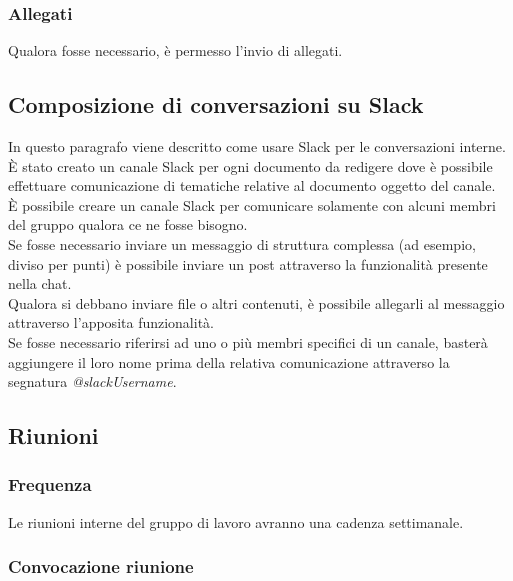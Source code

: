 \documentclass[../NormeDiProgetto.tex]{subfiles}
\begin{document}
				\subsubsection{Allegati}
					Qualora fosse necessario, è permesso l'invio di allegati.
			\subsection{Composizione di conversazioni su Slack}
				In questo paragrafo viene descritto come usare Slack per le conversazioni interne.\\
				È stato creato un canale Slack per ogni documento da redigere dove è possibile
				effettuare comunicazione di tematiche relative al documento oggetto del canale.\\
				È possibile creare un canale Slack per comunicare solamente con alcuni membri del
				gruppo qualora ce ne fosse bisogno.\\
				Se fosse necessario inviare un messaggio di struttura complessa (ad esempio, diviso
				per punti) è possibile inviare un post attraverso la funzionalità presente nella chat.\\
				Qualora si debbano inviare file o altri contenuti, è possibile allegarli al messaggio
				attraverso l'apposita funzionalità.\\
				Se fosse necessario riferirsi ad uno o più membri specifici di un canale, basterà
				aggiungere il loro nome prima della relativa comunicazione attraverso la segnatura
				\textit{@slackUsername}.
			\subsection{Riunioni}
				\subsubsection{Frequenza}
					Le riunioni interne del gruppo di lavoro avranno una cadenza settimanale.
				\subsubsection{Convocazione riunione}
\end{document}
